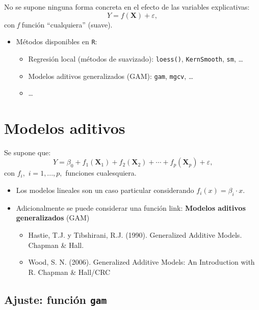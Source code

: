 \documentclass[
]{book}
\theoremstyle{break}
\begin{document}
No se supone ninguna forma concreta en el efecto de las variables explicativas:
\[Y=f\left(  \mathbf{X}\right)  +\varepsilon,\]
con \emph{f} función ``cualquiera'' (suave).

\begin{itemize}
\item
  Métodos disponibles en \texttt{R}:

  \begin{itemize}
  \item
    Regresión local (métodos de suavizado): \texttt{loess()}, \texttt{KernSmooth}, \texttt{sm}, \ldots{}
  \item
    Modelos aditivos generalizados (GAM): \texttt{gam}, \texttt{mgcv}, \ldots{}
  \item
    \ldots{}
  \end{itemize}
\end{itemize}

\hypertarget{modelos-aditivos}{%
\section{Modelos aditivos}\label{modelos-aditivos}}

Se supone que:
\[Y=\beta_{0}+f_{1}\left(  \mathbf{X}_{1}\right)  +f_{2}\left(  \mathbf{X}_{2}\right)  +\cdots+f_{p}\left(  \mathbf{X}_{p}\right)  +\varepsilon\text{,}\]
con \(f_{i},\) \(i=1,...,p,\) funciones cualesquiera.

\begin{itemize}
\item
  Los modelos lineales son un caso particular considerando \(f_{i}(x) = \beta_{i}·x\).
\item
  Adicionalmente se puede considerar una función link: \textbf{Modelos aditivos generalizados} (GAM)

  \begin{itemize}
  \item
    Hastie, T.J. y Tibshirani, R.J. (1990). Generalized Additive Models. Chapman \& Hall.
  \item
    Wood, S. N. (2006). Generalized Additive Models: An Introduction with R. Chapman \& Hall/CRC
  \end{itemize}
\end{itemize}

\hypertarget{ajuste-funciuxf3n-gam}{%
\subsection{\texorpdfstring{Ajuste: función \texttt{gam}}{Ajuste: función gam}}\label{ajuste-funciuxf3n-gam}}
\end{document}
